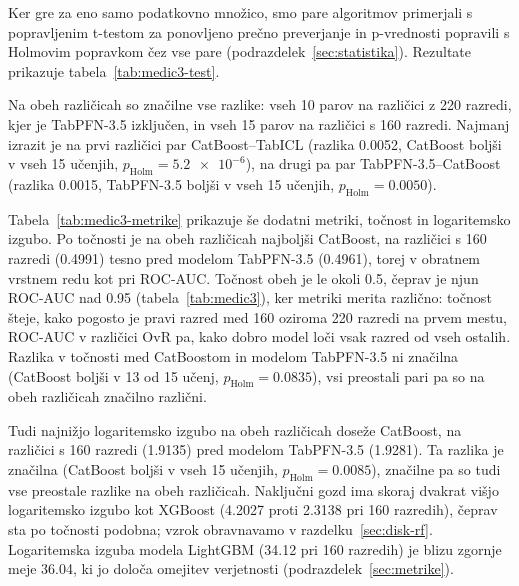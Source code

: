 \documentclass[a4paper,12pt,openright]{book}
\begin{document}


Ker gre za eno samo podatkovno množico, smo pare algoritmov primerjali s
popravljenim t-testom za ponovljeno prečno preverjanje in p-vrednosti popravili
s Holmovim popravkom čez vse pare (podrazdelek~\ref{sec:statistika}).
Rezultate prikazuje tabela~\ref{tab:medic3-test}.

Na obeh različicah so značilne vse razlike: vseh 10 parov na različici z 220
razredi, kjer je TabPFN-3.5 izključen, in vseh 15 parov na različici s 160
razredi. Najmanj izrazit je na prvi različici par CatBoost--TabICL (razlika
\num{0.0052}, CatBoost boljši v vseh 15 učenjih, $p_\mathrm{Holm} =
\num{5.2e-6}$), na drugi pa par TabPFN-3.5--CatBoost (razlika \num{0.0015},
TabPFN-3.5 boljši v vseh 15 učenjih, $p_\mathrm{Holm} = \num{0.0050}$).



Tabela~\ref{tab:medic3-metrike} prikazuje še dodatni metriki, točnost in
logaritemsko izgubo. Po točnosti je na obeh različicah najboljši CatBoost, na
različici s 160 razredi (\num{0.4991}) tesno pred modelom TabPFN-3.5
(\num{0.4961}), torej v obratnem vrstnem redu kot pri ROC-AUC. Točnost obeh je
le okoli \num{0.5}, čeprav je njun ROC-AUC nad \num{0.95}
(tabela~\ref{tab:medic3}), ker metriki merita različno: točnost šteje, kako
pogosto je pravi razred med 160 oziroma 220 razredi na prvem mestu, ROC-AUC v
različici OvR pa, kako dobro model loči vsak razred od vseh ostalih. Razlika v
točnosti med CatBoostom in modelom TabPFN-3.5 ni značilna (CatBoost boljši v 13
od 15 učenj, $p_\mathrm{Holm} = \num{0.0835}$), vsi preostali pari pa so na
obeh različicah značilno različni.

Tudi najnižjo logaritemsko izgubo na obeh različicah doseže CatBoost, na
različici s 160 razredi (\num{1.9135}) pred modelom TabPFN-3.5 (\num{1.9281}).
Ta razlika je značilna (CatBoost boljši v vseh 15 učenjih, $p_\mathrm{Holm} =
\num{0.0085}$), značilne pa so tudi vse preostale razlike na obeh različicah.
Naključni gozd ima skoraj dvakrat višjo logaritemsko izgubo kot XGBoost
(\num{4.2027} proti \num{2.3138} pri 160 razredih), čeprav sta po točnosti
podobna; vzrok obravnavamo v razdelku~\ref{sec:disk-rf}. Logaritemska izguba
modela LightGBM (\num{34.12} pri 160 razredih) je blizu zgornje meje
\num{36.04}, ki jo določa omejitev verjetnosti (podrazdelek~\ref{sec:metrike}).
\end{document}
